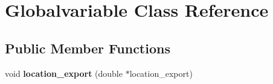 \hypertarget{class_globalvariable}{\section{Globalvariable Class Reference}
\label{class_globalvariable}
}
\subsection*{Public Member Functions}
\begin{DoxyCompactItemize}
\item 
\hypertarget{class_globalvariable_ad5dedf0d6804fb2b708ec59f356cfedb}{void {\bfseries location\-\_\-export} (double $\ast$location\-\_\-export)}\label{class_globalvariable_ad5dedf0d6804fb2b708ec59f356cfedb}

\end{DoxyCompactItemize}

